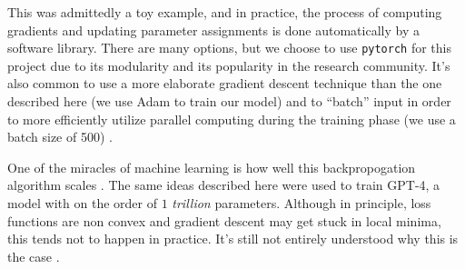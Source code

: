 This was admittedly a toy example, and in practice, the process of computing gradients and updating parameter assignments is done automatically by a software library. There are many options, but we choose to use \texttt{pytorch} \cite{pytorch} for this project due to its modularity and its popularity in the research community. It's also common to use a more elaborate gradient descent technique than the one described here (we use Adam \cite{adam} to train our model) and to ``batch'' input in order to more efficiently utilize parallel computing during the training phase (we use a batch size of 500) \cite[\S 10.7.2]{ISL}.

One of the miracles of machine learning is how well this backpropogation algorithm scales \cite[\S 13.2.6]{PML}. The same ideas described here were used to train GPT-4, a model with on the order of $1$ \emph{trillion} parameters. Although in principle, loss functions are non convex and gradient descent may get stuck in local minima, this tends not to happen in practice. It's still not entirely understood why this is the case \cite[\S 13.4]{PML}.

